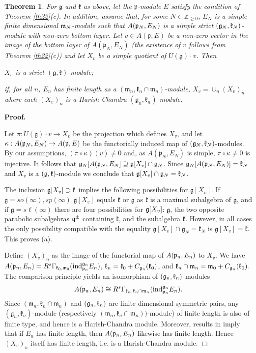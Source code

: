 \documentclass[12pt]{article}
\newcounter{theorem}
\newtheorem{theo}{Theorem}[section]
\newenvironment{proof}{ \textbf{Proof.}}{$\Box$}
\newcommand {\ZZ} {\mathbb {Z}}
\newcommand {\romanV} {${\overline{\underline{\mathrm{V}}}}$}
\newcommand{\kk}{\mathfrak{k}}
\newcommand{\mm}{\mathfrak{m}}
\newcommand{\pp}{\mathfrak{p}}
\renewcommand{\gg}{\mathfrak{g}}
\newcommand{\refth}[1]{Theorem \ref{#1}}
\renewcommand{\sp}{{sp}}
\renewcommand{\sl}{{s\ell}}
\newcommand{\so}{{so}}
\begin{document}
\begin{theo}\label{th43}
For $\gg$ and $\kk$ as above, let the $\pp$-module $E$ satisfy the  condition of \refth{th22}(c). In addition, assume that, for some  $N\in\ZZ_{\geq 0}$, $E_N$ is a simple finite dimensional $\frak m_{N}$-module such that $A(\frak p_{N}, E_{N})$  is a simple strict $(\frak g_{N}, \frak k_{N})$-module with non-zero bottom layer. Let $v\in A(\pp,E)$ be a non-zero vector in the image of the bottom layer of $A(\pp_{N},E_{N})$  (the existence of $v$ follows from \refth{th22}(c)) and let $X_v$ be a simple quotient of $U(\gg)\cdot v$. Then
\item[(a)] $X_v$ is a strict $(\gg,\kk)$-module;
\item[(b)] if, for all $n$, $E_n$ has finite length as a
 $(\mm_n , \kk_n\cap\mm_n)$-module, $X_v=\cup_n(X_v)_n$ where each $(X_v)_n$ is a  Harish-Chandra $(\gg_n,\kk_n)$-module.
\end{theo}
\begin{proof}
\item[(a)] Let $\pi: U(\gg)\cdot v\to X_v$ be the projection which defines $X_v$, and let $\kappa :A(\frak p_{N}, E_{N})\to A(\frak p, E)$ be the functorially induced map of $(\frak g_{N}, \frak k_{N})$-modules. By our assumptions,  $(\pi\circ\kappa) (v)\neq 0$ and, as $A(\pp_N,E_N)$ is simple, $\pi\circ\kappa\neq 0$ is injective. It follows that $\frak g_{N} [A(\frak p_{N}, E_{N}]\supseteq \frak g [X_v]\cap\frak g_{N}$. Since $\frak g_{N} [A(\frak p_{N}, E_{N})] = \frak k_{N}$ and $X_v$ is a $(\frak g,\frak k)$-module we conclude that $\frak g [X_v]\cap\frak g_{N} = \frak k_{N}$.

The inclusion $\frak g [X_v]\supset \frak k$ implies the following possibilities for $\gg[X_v]$. If $\gg=\so(\infty), \sp(\infty)$ $\gg[X_v]$ equals $\kk$ or $\gg$ as $\kk$ is a maximal subalgebra of $\gg$, and if $\gg=\sl(\infty)$ there are four possibilities for $\frak g [X_v]$: $\gg$, the two opposite parabolic subalgebras ${\frak q}^\pm$ containing $\kk$, and the subalgebra $\kk$. However, in all cases the only possibility compatible with the equality $\gg[X_v]\cap\gg_N=\kk_N$ is $\gg[X_v]=\kk$. This proves (a).
\item[(b)] Define $(X_v)_n$ as the image of the functorial map of $A(\frak p_n, E_n)$ to $X_v$.  We have $A(\frak p_n, E_n) = R^s\Gamma_{\frak k_{0},\frak m_{0}} (\text{ind}^{\frak g_{n}}_{\frak p_{n}} E_n)$, $\frak k_n = \frak k_0 +C_{\frak g_{n}} (\frak k_0)$, and $\frak k_n\cap \frak m_n = \frak m_0 + C_{\frak g_{n}} (\frak k_0)$. The comparison principle yields an isomorphism of $(\frak g_n, \frak k_n)$-modules
$$
A(\frak p_n, E_n) \cong R^s\Gamma_{\frak k_{n},\frak k_{n}\cap\frak
 m_{n}} (\text{ind}^{\frak g_{n}}_{\frak p_{n}} E_n).
$$
Since $(\mm_n,\kk_n\cap\mm_n)$ and $(\frak g_n, \frak k_n)$ are finite dimensional symmetric pairs, any $(\gg_n,\kk_n)$-module (respectively $(\mm_n,\kk_n\cap\mm_n))$-module) of finite length is also of finite type, and hence is a Harish-Chandra module. Moreover, results in \cite[Ch.\romanV]{KV} imply that if $E_n$ has finite length, then $A(\frak p_n, E_n)$ likewise has finite length. Hence $(X_v)_n$ itself has finite length, i.e. is a Harish-Chandra module.
\end{proof}
\end{document}
